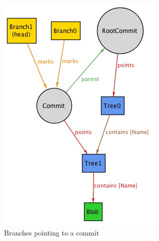 \begin{figure}[h!] 
	\caption{Branches pointing to a commit}
	\centering
	\includegraphics[scale=0.65]{images/branchexample.png}
\end{figure}

